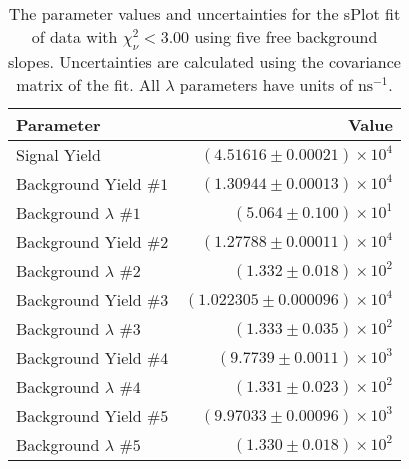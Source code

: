 
\begin{table}[h]
    \begin{center}
        \begin{tabular}{lr}\toprule
            Parameter & Value \\\midrule
            Signal Yield & $(4.51616 \pm 0.00021) \times 10^{4}$ \\
            Background Yield $\#1$ & $(1.30944 \pm 0.00013) \times 10^{4}$ \\
            Background $\lambda$ $\#1$ & $(5.064 \pm 0.100) \times 10^{1}$ \\
            Background Yield $\#2$ & $(1.27788 \pm 0.00011) \times 10^{4}$ \\
            Background $\lambda$ $\#2$ & $(1.332 \pm 0.018) \times 10^{2}$ \\
            Background Yield $\#3$ & $(1.022305 \pm 0.000096) \times 10^{4}$ \\
            Background $\lambda$ $\#3$ & $(1.333 \pm 0.035) \times 10^{2}$ \\
            Background Yield $\#4$ & $(9.7739 \pm 0.0011) \times 10^{3}$ \\
            Background $\lambda$ $\#4$ & $(1.331 \pm 0.023) \times 10^{2}$ \\
            Background Yield $\#5$ & $(9.97033 \pm 0.00096) \times 10^{3}$ \\
            Background $\lambda$ $\#5$ & $(1.330 \pm 0.018) \times 10^{2}$ \\\bottomrule
        \end{tabular}
        \caption{The parameter values and uncertainties for the sPlot fit of data with $\chi^2_\nu < 3.00$ using five free background slopes. Uncertainties are calculated using the covariance matrix of the fit. All $\lambda$ parameters have units of $\si{\nano\second}^{-1}$.}
    \end{center}
\end{table}
